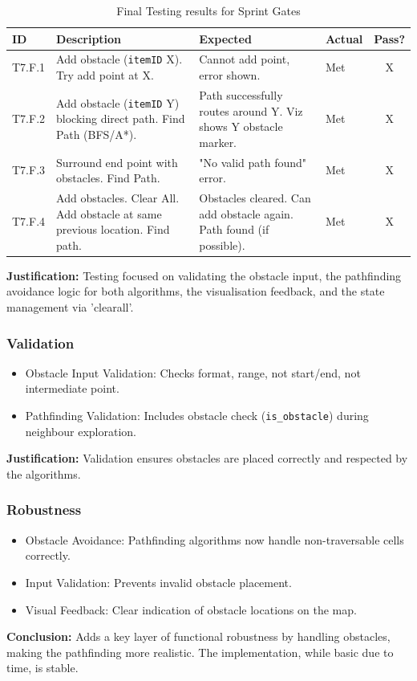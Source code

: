\begin{table}[htbp] %
	\centering
	\begin{tabularx}{\textwidth}{|l|X|p{3.5cm}|p{3.5cm}|c|}
		\hline
		\textbf{ID} & \textbf{Description} & \textbf{Expected} & \textbf{Actual} & \textbf{Pass?} \\
		\hline
		T7.F.1 & Add obstacle (\verb|itemID| X). Try add point at X. & Cannot add point, error shown. & Met & X \\
		\hline
		T7.F.2 & Add obstacle (\verb|itemID| Y) blocking direct path. Find Path (BFS/A*). & Path successfully routes around Y. Viz shows Y obstacle marker. & Met & X \\
		\hline
		T7.F.3 & Surround end point with obstacles. Find Path. & "No valid path found" error. & Met & X \\
		\hline
		T7.F.4 & Add obstacles. Clear All. Add obstacle at same previous location. Find path. & Obstacles cleared. Can add obstacle again. Path found (if possible). & Met & X \\
		\hline
	\end{tabularx}
	\caption{Final Testing results for Sprint Gates}
\end{table}


\textbf{Justification:} Testing focused on validating the obstacle input, the pathfinding avoidance logic for both algorithms, the visualisation feedback, and the state management via 'clearall'.

\subsubsection{Validation}
\begin{itemize}
	\item Obstacle Input Validation: Checks format, range, not start/end, not intermediate point.
	\item Pathfinding Validation: Includes obstacle check (\verb|is_obstacle|) during neighbour exploration.
\end{itemize}
\textbf{Justification:} Validation ensures obstacles are placed correctly and respected by the algorithms.

\subsubsection{Robustness}
\begin{itemize}
	\item Obstacle Avoidance: Pathfinding algorithms now handle non-traversable cells correctly.
	\item Input Validation: Prevents invalid obstacle placement.
	\item Visual Feedback: Clear indication of obstacle locations on the map.
\end{itemize}
\textbf{Conclusion:} Adds a key layer of functional robustness by handling obstacles, making the pathfinding more realistic. The implementation, while basic due to time, is stable.


